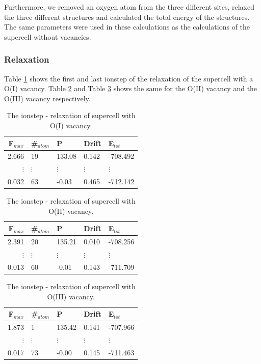 Furthermore, we removed an oxygen atom from the three different sites, relaxed the three different structures and calculated the total energy of the structures. The same parameters were used in these calculations as the calculations of the supercell without vacancies.

\subsubsection{Relaxation}

Table \ref{tab:ionstep_O_I} shows the first and last ionstep of the relaxation of the supercell with a O(I) vacancy. Table \ref{tab:ionstep_O_II} and Table \ref{tab:ionstep_O_III} shows the same for the O(II) vacancy and the O(III) vacancy respectively.

\begin{table}[H]\caption{The ionstep - relaxation of supercell with O(I) vacancy.}\label{tab:ionstep_O_I}
\begin{tabular}{rllll}
F$_{max}$ &\#$_{atom}$&	P&	Drift&	E$_{tot}$\\ \hline
2.666&	19&	133.08&	0.142&	-708.492\\
$\vdots$&$\vdots$&$\vdots$&$\vdots$&$\vdots$\\
0.032&	63&	-0.03&	0.465&	-712.142\\
\end{tabular}
\end{table}

\begin{table}[H]\caption{The ionstep - relaxation of supercell with O(II) vacancy.}\label{tab:ionstep_O_II}
\begin{tabular}{rllll}
F$_{max}$ &\#$_{atom}$&	P&	Drift&	E$_{tot}$\\ \hline
2.391&	20&	135.21&	0.010&	-708.256	\\
$\vdots$&$\vdots$&$\vdots$&$\vdots$&$\vdots$\\
0.013&	60&	-0.01&	0.143&	-711.709\\
\end{tabular}
\end{table}

\begin{table}[H]\caption{The ionstep - relaxation of supercell with O(III) vacancy.}\label{tab:ionstep_O_III}
\begin{tabular}{rllll}
F$_{max}$ &\#$_{atom}$&	P&	Drift&	E$_{tot}$\\ \hline
1.873&	1&	135.42&	0.141&	-707.966	\\
$\vdots$&$\vdots$&$\vdots$&$\vdots$&$\vdots$\\
0.017&	73&	-0.00&	0.145&	-711.463	\\
\end{tabular}
\end{table}

